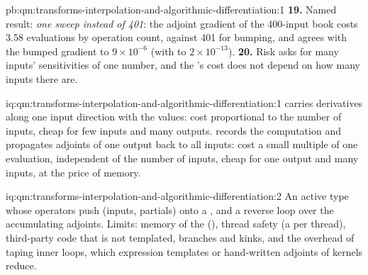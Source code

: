 \begin{solution}{pb:qm:transforms-interpolation-and-algorithmic-differentiation:1}
\textbf{19.} Named result: \emph{one sweep instead of 401}: the adjoint gradient of the 400-input book costs 3.58 evaluations by operation count, against 401 for bumping, and agrees with the bumped gradient to
$9 \times 10^{-6}$ (with  to $2 \times 10^{-13}$).
\textbf{20.} Risk asks for many inputs' sensitivities of one number, and the 's cost does not depend on how many inputs there are.
\end{solution}

\begin{solution}{iq:qm:transforms-interpolation-and-algorithmic-differentiation:1}
 carries derivatives along one input direction with the values: cost proportional to the number of inputs, cheap for few inputs and many outputs.  records the computation and
propagates adjoints of one output back to all inputs: cost a small multiple of one evaluation, independent of the number of inputs, cheap for one output and many inputs, at the price of memory.
\end{solution}

\begin{solution}{iq:qm:transforms-interpolation-and-algorithmic-differentiation:2}
An active type whose operators push (inputs, partials) onto a , and a reverse loop over the  accumulating adjoints. Limits: memory of the  (), thread safety (a  per
thread), third-party code that is not templated, branches and kinks, and the overhead of taping inner loops, which expression templates or hand-written adjoints of kernels reduce.
\end{solution}

